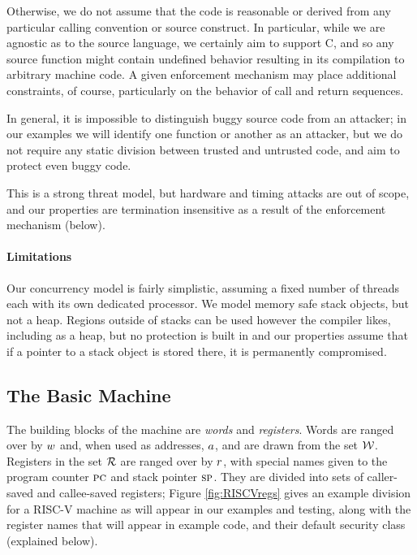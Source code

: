 \documentclass[10pt,conference]{ieeetran}%
\theoremstyle{definition}
\begin{document}
Otherwise, we do not assume that the code is reasonable or derived from any particular
calling convention or source construct. In particular, while we are agnostic as to the source
language, we certainly aim to support C, and so any source function might contain undefined
behavior resulting in its compilation to arbitrary machine code. A given enforcement
mechanism may place additional constraints, of course, particularly on the behavior of
call and return sequences.

In general, it is impossible to distinguish buggy source code from an attacker; in
our examples we will identify one function or another as an attacker, but we do not
require any static division between trusted and untrusted code, and aim to protect
even buggy code.

This is a strong threat model, but hardware and timing attacks are out of scope,
and our properties are termination insensitive as a result of the enforcement mechanism
(below).

\paragraph*{Limitations}

Our concurrency model is fairly
simplistic, assuming a fixed number of threads each with its own dedicated processor.
We model memory safe stack objects, but not a heap. Regions outside of
stacks can be used however the compiler likes, including as a heap, but no protection is
built in and our properties assume that if a pointer to a stack object is stored there,
it is permanently compromised.

\subsection{The Basic Machine}

The building blocks of the machine are {\em words} and {\em registers}.
Words are ranged over by \(w\) and, when used as addresses, \(a\),
and are drawn from the set \({\mathcal W}\).
Registers in the set \({\mathcal R}\) are ranged over by \(r\), with special names given to the
program counter \(\textsc{pc}\) and stack pointer \(\textsc{sp}\).
They are divided into sets of caller-saved and callee-saved registers;
Figure \ref{fig:RISCVregs} gives an example division for a RISC-V machine as will
appear in our examples and testing, along with the register names that will appear in
example code, and their default security class (explained below).
\end{document}
